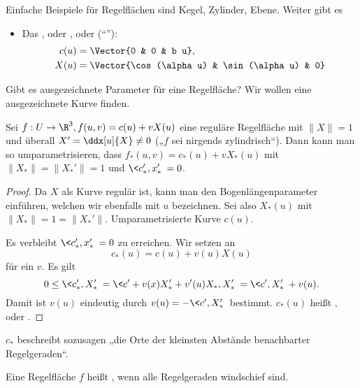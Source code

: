 \begin{ex}
	Einfache Beispiele für Regelflächen sind Kegel, Zylinder, Ebene.
	Weiter gibt es
	\begin{itemize}
		\item
			Das , oder , oder  (“”):
			\begin{align*}
				c(u) &= \Vector{0 & 0 & b u}, \\
				X(u) &= \Vector{\cos(\alpha u) & \sin(\alpha u) & 0}
			\end{align*}
	\end{itemize}
\end{ex}

Gibt es ausgezeichnete Parameter für eine Regelfläche?
Wir wollen eine ausgezeichnete Kurve finden.

\begin{lem}[Standardparameter]
	Sei $f: U \to \R^3, f(u,v) = c(u) + v X(u)$ eine reguläre Regelfläche mit $\|X\| = 1$ und überall $X' = \ddx[u]{X} \neq 0$ („$f$ sei nirgends zylindrisch“).
	Dann kann man so umparametrisieren, dass $f_*(u,v) = c_*(u) + vX_*(u)$ mit $\|X_*\| = \|X_*'\| = 1$ und $\<c_*', x_*'\> = 0$.
	\begin{proof}
		Da $X$ als Kurve regulär ist, kann man den Bogenlängenparameter einführen, welchen wir ebenfalls mit $u$ bezeichnen.
		Sei also $X_*(u)$ mit $\|X_*\| = 1 = \|X_*'\|$.
		Umparametrisierte Kurve $c(u)$.

		Es verbleibt $\<c_*', x_*'\> = 0$ zu erreichen.
		Wir setzen an
		\[
			c_*(u) = c(u) + v(u) X(u)
		\]
		für ein $v$.
		Es gilt
		\[
			0 \le \<c_*', X_*'\>
			= \<c' + v(x)X_*' + v'(u) X_*, X_*'\>
			= \<c', X_*'\> + v(u).
		\]
		Damit ist $v(u)$ eindeutig durch $v(u) = -\<c', X_*'\>$ bestimmt.
		$c_*(u)$ heißt , oder .
	\end{proof}
	\begin{note}
		$c_*$ beschreibt sozusagen „die Orte der kleinsten Abstände benachbarter Regelgeraden“.
	\end{note}
\end{lem}

\begin{df}
	Eine Regelfläche $f$ heißt , wenn alle Regelgeraden windschief sind.
\end{df}


